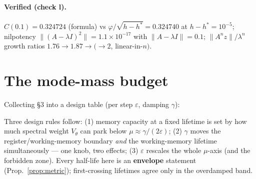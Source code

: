 \documentclass[11pt]{article}
\theoremstyle{plain}
\theoremstyle{definition}
\begin{document}
\paragraph{Verified (check l).} $C(0.1)=0.324724$ (formula) vs $\varphi/\sqrt{h-h^*}=0.324740$ at $h-h^*=10^{-5}$; nilpotency $\lVert(A-\lambda I)^2\rVert=1.1\times10^{-17}$ with $\lVert A-\lambda I\rVert=0.1$; $\lVert A^nz\rVert/\lambda^n$ growth ratios $1.76\to1.87\to(\to2$, linear-in-$n)$.

\section{The mode-mass budget}
Collecting \S3 into a design table (per step $\varepsilon$, damping $\gamma$):
\begin{center}\small
{}
\end{center}
Three design rules follow: (1) memory capacity at a fixed lifetime is set by how much spectral weight $V_\theta$ can park below $\mu\approx\gamma/(2\varepsilon)$; (2) $\gamma$ moves the register/working-memory boundary \emph{and} the working-memory lifetime simultaneously --- one knob, two effects; (3) $\varepsilon$ rescales the whole $\mu$-axis (and the forbidden zone). Every half-life here is an \textbf{envelope} statement (Prop.~\ref{prop:metric}); first-crossing lifetimes agree only in the overdamped band.
\end{document}
